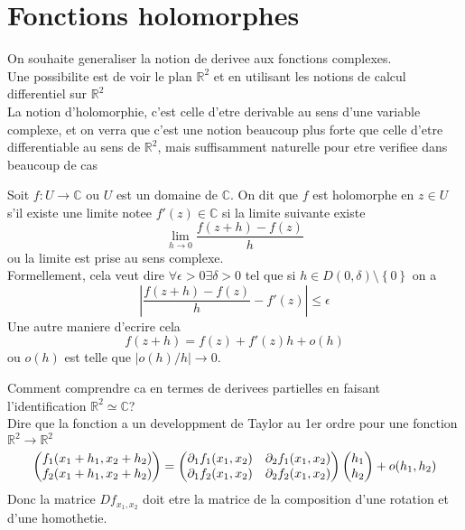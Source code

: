 \documentclass[../main.tex]{subfiles}
\begin{document}
\section{Fonctions holomorphes}
On souhaite generaliser la notion de derivee aux fonctions complexes.\\
Une possibilite est de voir le plan $ \mathbb{R}^{2}$ et en utilisant les notions de calcul differentiel sur $ \mathbb{R}^{2}$ \\
La notion d'holomorphie, c'est celle d'etre derivable au sens d'une variable complexe, et on verra que c'est une notion beaucoup plus forte que celle d'etre differentiable au sens de $ \mathbb{R}^{2}$, mais suffisamment naturelle pour etre verifiee dans beaucoup de cas
\begin{defn}
	Soit $f: U \to \mathbb{C}$ ou $U$ est un domaine de $ \mathbb{C}$. On dit que $f$ est holomorphe en $z \in U$ s'il existe une limite notee $ f'( z) \in \mathbb{C}$ si la limite suivante existe
	\[ 
		\lim_{h \to 0} \frac{f( z+h) - f( z) }{h}
	\]
	ou la limite est prise au sens  complexe.\\
	Formellement, cela veut dire $ \forall \epsilon >0 \exists \delta>0$ tel que si $ h \in D( 0, \delta) \setminus \left\{ 0 \right\} $ on a 
	\[ 
		| \frac{f( z+h) -f( z) }{h}- f'( z) 	| \leq \epsilon
	\]
Une autre maniere d'ecrire cela 
\[ 
	f( z+h)  = f( z) + f'( z) h + o( h) 
\]
ou $ o( h) $ est telle que $|o( h) /h| \to 0$.\\
\end{defn}
Comment comprendre ca en termes de derivees partielles en faisant l'identification $ \mathbb{R}^{2}\simeq \mathbb{C}$?\\
Dire que la fonction a un developpment de Taylor au 1er ordre pour une fonction $ \mathbb{R}^{2}\to \mathbb{R}^{2}$ 
\begin{align*}
\begin{pmatrix}
	f_1 ( x_1 + h_1, x_2+h_2) \\ f_2( x_1+h_1, x_2+h_2) 
\end{pmatrix} =
\begin{pmatrix}
	\partial_1 f_1( x_1,x_2) & \partial_2 f_1( x_1,x_2) \\
	\partial_1f_2( x_1,x_2) & \partial_2 f_2( x_1,x_2) 
\end{pmatrix} 
\begin{pmatrix}
h_1\\h_2
\end{pmatrix} + o ( h_1,h_2) 
\end{align*}
Donc la matrice $ Df_{x_1,x_2} $ doit etre la matrice de la composition d'une rotation et d'une homothetie.
\end{document}
